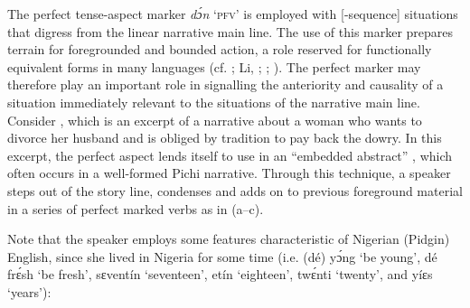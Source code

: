 \z
\z

The perfect tense-aspect marker \textit{dɔ́n} ‘\textsc{pfv}’ is employed with [-sequence] situations that digress from the linear narrative main line. The use of this marker prepares terrain for foregrounded and bounded action, a role reserved for functionally equivalent forms in many languages (cf. \citealt{Anderson1982}; Li, \citealt{ThompsonThompson1982}; \citealt{ThompsonThompson1982}; \citealt{Slobin1994}). The perfect marker may therefore play an important role in signalling the anteriority and causality of a situation immediately relevant to the situations of the narrative main line. Consider , which is an excerpt of a narrative about a woman who wants to divorce her husband and is obliged by tradition to pay back the dowry. In this excerpt, the perfect aspect lends itself to use in an “embedded abstract” \citep{Labov1972}, which often occurs in a well-formed Pichi narrative. Through this technique, a speaker steps out of the story line, condenses and adds on to previous foreground material in a series of perfect marked verbs as in (a–c).


Note that the speaker employs some features characteristic of Nigerian (Pidgin) English, since she lived in Nigeria for some time (i.e. (dé) yɔ́ng ‘be young’, dé frɛ́sh ‘be fresh’, sɛventín ‘seventeen’, etín ‘eighteen’, twɛ́nti ‘twenty’, and yíɛs ‘years’):



